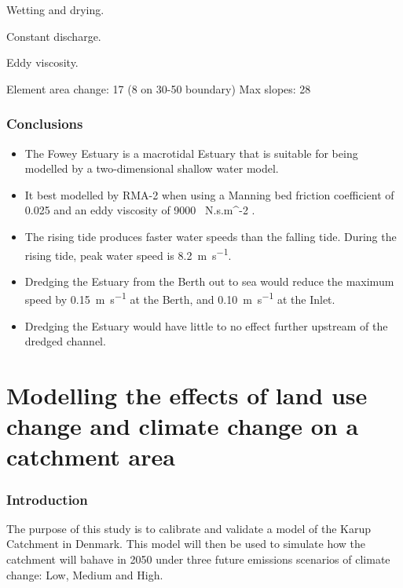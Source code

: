 \documentclass{article}
\begin{document}
Wetting and drying.

Constant discharge.

Eddy viscosity.

Element area change: 17 (8 on 30-50 boundary)
Max slopes: 28

\section{Conclusions}


\begin{itemize}
    \item The Fowey Estuary is a macrotidal Estuary that is suitable for being modelled by a two-dimensional shallow water model.
    \item It best modelled by RMA-2 when using a Manning bed friction coefficient of 0.025 and an eddy viscosity of \SI{9000}{ N.s.m^{-2} }.
    \item The rising tide produces faster water speeds than the falling tide. During the rising tide, peak water speed is \SI{8.2}{m.s^{-1}}.
    \item Dredging the Estuary from the Berth out to sea would reduce the maximum speed by \SI{0.15}{m.s^{-1}} at the Berth, and \SI{0.10}{m.s^{-1}} at the Inlet.
    \item Dredging the Estuary would have little to no effect further upstream of the dredged channel.
\end{itemize}

\printbibliography[filter=practical1]

\newpage
\setcounter{section}{0}
\setcounter{figure}{0}

\part*{Modelling the effects of land use change and climate change on a catchment area}

\section{Introduction}

The purpose of this study is to calibrate and validate a model of the Karup Catchment in Denmark. This model will then be used to simulate how the catchment will bahave in 2050 under three future emissions scenarios of climate change: Low, Medium and High.  
\end{document}

